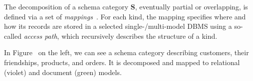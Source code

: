 The decomposition of a schema category $\mathbf{S}$, eventually partial or overlapping, is defined via a set of \textit{mappings}~\citep{mm_cat_journal}. %
%
%
For each kind, the mapping specifies where and how its records are stored in a selected single-/multi-model DBMS using a so-called \textit{access path}, which recursively describes the structure of a kind. %

\begin{example}
In Figure~ on the left, we can see a schema category describing customers, their friendships, products, and orders. It is decomposed and mapped to relational (violet) and document (green) models.
\end{example}


